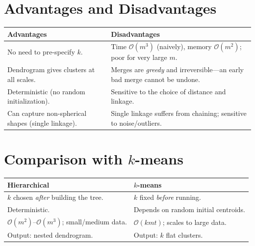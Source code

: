 \documentclass[11pt,a4paper]{report}
\theoremstyle{definition}
\theoremstyle{plain}
\theoremstyle{remark}
\begin{document}
\section{Advantages and Disadvantages}
\begin{center}
\begin{tabular}{@{}p{6.4cm}p{6.4cm}@{}}
\toprule
\textbf{Advantages} & \textbf{Disadvantages}\\
\midrule
No need to pre-specify $k$. & Time $\mathcal{O}(m^3)$ (naively), memory
$\mathcal{O}(m^2)$; poor for very large $m$.\\
Dendrogram gives clusters at all scales. & Merges are \emph{greedy} and
irreversible---an early bad merge cannot be undone.\\
Deterministic (no random initialization). & Sensitive to the choice of distance
and linkage.\\
Can capture non-spherical shapes (single linkage). & Single linkage suffers
from chaining; sensitive to noise/outliers.\\
\bottomrule
\end{tabular}
\end{center}

\section{Comparison with $k$-means}
\begin{center}
\begin{tabular}{@{}p{6.4cm}p{6.4cm}@{}}
\toprule
\textbf{Hierarchical} & \textbf{$k$-means}\\
\midrule
$k$ chosen \emph{after} building the tree. & $k$ fixed \emph{before} running.\\
Deterministic. & Depends on random initial centroids.\\
$\mathcal{O}(m^2)$--$\mathcal{O}(m^3)$; small/medium data. & $\mathcal{O}(kmt)$;
scales to large data.\\
Output: nested dendrogram. & Output: $k$ flat clusters.\\
\bottomrule
\end{tabular}
\end{center}
\end{document}
